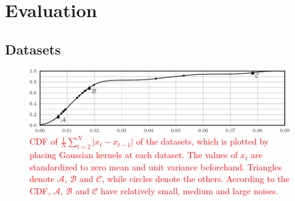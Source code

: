 \documentclass[sigconf]{acmart}
\newcommand\compactdel[1]{{\textcolor{red}{#1}}}
\newcommand\compactdel[1]{}
\newcommand\compactvspace[1]{\vspace{#1}}
\newcommand\compactdel[1]{#1}
\newcommand\compactvspace[1]{}
\newcommand{\DATASETA}{$\mathcal{A}$}
\newcommand{\DATASETB}{$\mathcal{B}$}
\newcommand{\DATASETC}{$\mathcal{C}$}
\newcommand{\abs}[1]{\left|#1\right|}
\begin{document}



\compactvspace{-1em}
\section{Evaluation}
\label{sec:experiments}

\subsection{Datasets}

\compactdel{
\begin{figure}
	\centering
	\includegraphics[width=\columnwidth]{data_diff_distrib}
	\caption{\compactdel{
		CDF of $\frac{1}{N} \sum_{t=2}^N \abs{x_t - x_{t-1}}$ of the datasets, which is plotted by placing Gaussian kernels at each dataset.
		The values of $x_t$ are standardized to zero mean and unit variance beforehand.
		Triangles denote \DATASETA{}, \DATASETB{} and \DATASETC{}, while circles denote the others.
		According to the CDF, \DATASETA{}, \DATASETB{} and \DATASETC{} have relatively small, medium and large noises.
	}}\label{fig:data-diff-distrib}
\end{figure}
}
\end{document}
